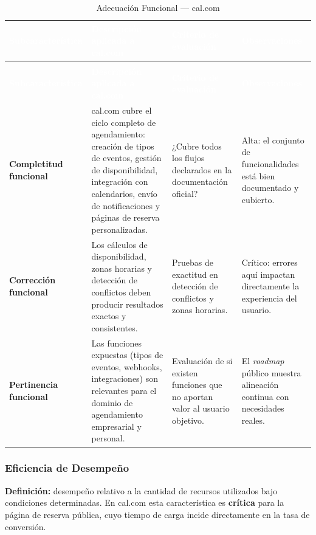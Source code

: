 \documentclass[12pt, a4paper]{article}
\newcommand{\rowpair}{\rowcolor{grisMedio}}
\newcommand{\rowimpar}{\rowcolor{grisClaro}}
\begin{document}
\begin{longtable}{>{\bfseries}p{3cm} p{4.5cm} p{4cm} p{3.5cm}}
\caption{Adecuación Funcional — cal.com} \label{tab:funcional} \\
\rowcolor{azulClaro}
\textcolor{white}{\textbf{Subcaracterística}} &
\textcolor{white}{\textbf{Descripción aplicada a cal.com}} &
\textcolor{white}{\textbf{Criterio de evaluación}} &
\textcolor{white}{\textbf{Observaciones}} \\
\endfirsthead
\multicolumn{4}{c}{\tablename\ \thetable{} -- continuación} \\
\rowcolor{azulClaro}
\textcolor{white}{\textbf{Subcaracterística}} &
\textcolor{white}{\textbf{Descripción aplicada a cal.com}} &
\textcolor{white}{\textbf{Criterio de evaluación}} &
\textcolor{white}{\textbf{Observaciones}} \\
\endhead
\rowpair
Completitud funcional &
cal.com cubre el ciclo completo de agendamiento: creación de tipos de eventos, gestión
de disponibilidad, integración con calendarios, envío de notificaciones y páginas de
reserva personalizadas. &
¿Cubre todos los flujos declarados en la documentación oficial? &
Alta: el conjunto de funcionalidades está bien documentado y cubierto. \\
\rowimpar
Corrección funcional &
Los cálculos de disponibilidad, zonas horarias y detección de conflictos deben producir
resultados exactos y consistentes. &
Pruebas de exactitud en detección de conflictos y zonas horarias. &
Crítico: errores aquí impactan directamente la experiencia del usuario. \\
\rowpair
Pertinencia funcional &
Las funciones expuestas (tipos de eventos, webhooks, integraciones) son relevantes para
el dominio de agendamiento empresarial y personal. &
Evaluación de si existen funciones que no aportan valor al usuario objetivo. &
El \textit{roadmap} público muestra alineación continua con necesidades reales. \\
\end{longtable}

\subsubsection{Eficiencia de Desempeño}

\textbf{Definición:} desempeño relativo a la cantidad de recursos utilizados bajo
condiciones determinadas. En cal.com esta característica es \textbf{crítica} para la
página de reserva pública, cuyo tiempo de carga incide directamente en la tasa de
conversión.
\end{document}
